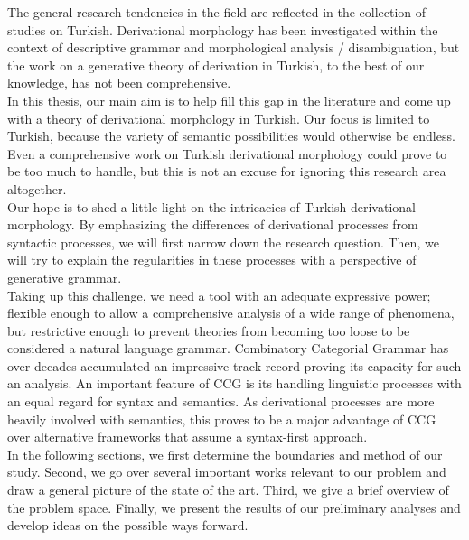 \documentclass[11pt]{article} %
\begin{document}
The general research tendencies in the field are reflected in the collection of studies on Turkish. Derivational morphology has been investigated within the context of descriptive grammar and morphological analysis / disambiguation, but the work on a generative theory of derivation in Turkish, to the best of our knowledge, has not been comprehensive. \\

In this thesis, our main aim is to help fill this gap in the literature and come up with a theory of derivational morphology in Turkish. Our focus is limited to Turkish, because the variety of semantic possibilities would otherwise be endless. Even a comprehensive work on Turkish derivational morphology could prove to be too much to handle, but this is not an excuse for ignoring this research area altogether. \\

Our hope is to shed a little light on the intricacies of Turkish derivational morphology. By emphasizing the differences of derivational processes from syntactic processes, we will first narrow down the research question. Then, we will try to explain the regularities in these processes with a perspective of generative grammar. \\

Taking up this challenge, we need a tool with an adequate expressive power; flexible enough to allow a comprehensive analysis of a wide range of phenomena, but restrictive enough to prevent theories from becoming too loose to be considered a natural language grammar. Combinatory Categorial Grammar has over decades accumulated an impressive track record proving its capacity for such an analysis. An important feature of CCG is its handling linguistic processes with an equal regard for syntax and semantics. As derivational processes are more heavily involved with semantics, this proves to be a major advantage of CCG over alternative frameworks that assume a syntax-first approach. \\

In the following sections, we first determine the boundaries and method of our study. Second, we go over several important works relevant to our problem and draw a general picture of the state of the art. Third, we give a brief overview of the problem space. Finally, we present the results of our preliminary analyses and develop ideas on the possible ways forward. \\

\newpage
\end{document}
